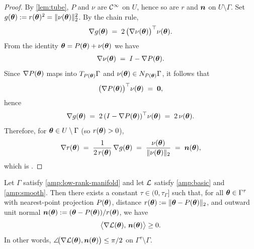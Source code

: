 \begin{proof}By \cref{lem:tube}, $P$ and $\nu$ are $\mathcal{C}^\infty$ on $U$, hence so are $r$ and ${\bm{n}}$ on $U\setminus\Gamma$.
Set $g({\bm{\theta}}):=r({\bm{\theta}})^2=\|\nu({\bm{\theta}})\|_2^2$. 
By the chain rule,
\begin{align*}
  \nabla g({\bm{\theta}})
  \;=\; 2\,\big(\nabla \nu({\bm{\theta}})\big)^\top \nu({\bm{\theta}}).
\end{align*}
From the identity ${\bm{\theta}}=P({\bm{\theta}})+\nu({\bm{\theta}})$ we have \begin{align*}
  \nabla \nu({\bm{\theta}})\;=\; I - \nabla P({\bm{\theta}}).
\end{align*}
Since $\nabla P({\bm{\theta}})$ maps into $T_{P({\bm{\theta}})}\Gamma$ and 
$\nu({\bm{\theta}})\in N_{P({\bm{\theta}})}\Gamma$, it follows that
\begin{align*}
  \big(\nabla P({\bm{\theta}})\big)^\top \nu({\bm{\theta}}) \;=\; {\bm{0}},
\end{align*}
hence
\begin{align*}
  \nabla g({\bm{\theta}})
  \;=\; 2\,(I-\nabla P({\bm{\theta}}))^\top \nu({\bm{\theta}})
  \;=\; 2\,\nu({\bm{\theta}}).
\end{align*}
Therefore, for ${\bm{\theta}}\in U\setminus\Gamma$ (so $r({\bm{\theta}})>0$),
\begin{align*}
  \nabla r({\bm{\theta}})
  \;=\; \frac{1}{2\,r({\bm{\theta}})}\,\nabla g({\bm{\theta}})
  \;=\; \frac{\nu({\bm{\theta}})}{\|\nu({\bm{\theta}})\|_2} 
  \;=\; {\bm{n}}({\bm{\theta}}),
\end{align*}
which is .
\end{proof}

\begin{lemma}\label{lem:acute-angle-short}
Let $\Gamma$ satisfy \cref{amp:low-rank-manifold} and let $\mathcal{L}$ satisfy \cref{amp:basic} and \cref{amp:smooth}.
Then there exists a constant $\tau\in(0,\tau_{\Gamma}]$ such that, for all
${\bm{\theta}}\in\Gamma^{\tau}$ with nearest-point projection $P({\bm{\theta}})$, distance
$r({\bm{\theta}}):=\|{\bm{\theta}}-P({\bm{\theta}})\|_2$, and outward unit normal
${\bm{n}}({\bm{\theta}}):=({\bm{\theta}}-P({\bm{\theta}}))/r({\bm{\theta}})$, we have
\begin{align}\label{eq:acute-angle-claim}
\big\langle \nabla \mathcal{L}({\bm{\theta}}),\, {\bm{n}}({\bm{\theta}})\big\rangle \geq 0.
\end{align}
In other words, $\angle\!\big(\nabla\mathcal{L}({\bm{\theta}}),{\bm{n}}({\bm{\theta}})\big)\leq\pi/2$ on
$\Gamma^{\tau}\setminus\Gamma$.
\end{lemma}

